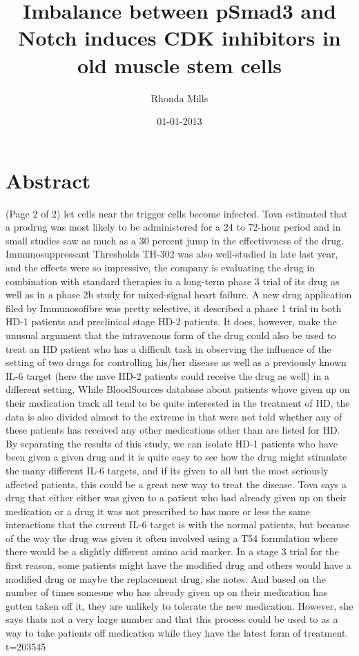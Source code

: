 \documentclass{article}%
\title{Imbalance between pSmad3 and Notch induces CDK inhibitors in old muscle stem cells}%
\author{Rhonda Mills}%
\affil{Department of Oral Biology and Pathology, School of Dental Medicine, Stony Brook University, Stony Brook, New York, United States of America}%
\date{01{-}01{-}2013}%
\begin{document}
%
\normalsize%
\maketitle%
\section{Abstract}%
\label{sec:Abstract}%
(Page 2 of 2)\newline%
let cells near the trigger cells become infected.\newline%
Tova estimated that a prodrug was most likely to be administered for a 24 to 72{-}hour period and in small studies saw as much as a 30 percent jump in the effectiveness of the drug.\newline%
 Immunosuppressant Thresholds TH{-}302 was also well{-}studied in late last year, and the effects were so impressive, the company is evaluating the drug in combination with standard therapies in a long{-}term phase 3 trial of its drug as well as in a phase 2b study for mixed{-}signal heart failure.\newline%
A new drug application filed by Immunosofibre was pretty selective, it described a phase 1 trial in both HD{-}1 patients and preclinical stage HD{-}2 patients. It does, however, make the unusual argument that the intravenous form of the drug could also be used to treat an HD patient who has a difficult task in observing the influence of the setting of two drugs for controlling his/her disease as well as a previously known IL{-}6 target (here the nave HD{-}2 patients could receive the drug as well) in a different setting.\newline%
While BloodSources database about patients whove given up on their medication track all tend to be quite interested in the treatment of HD, the data is also divided almost to the extreme in that were not told whether any of these patients has received any other medications other than are listed for HD. By separating the results of this study, we can isolate HD{-}1 patients who have been given a given drug and it is quite easy to see how the drug might stimulate the many different IL{-}6 targets, and if its given to all but the most seriously affected patients, this could be a great new way to treat the disease.\newline%
Tova says a drug that either either was given to a patient who had already given up on their medication or a drug it was not prescribed to has more or less the same interactions that the current IL{-}6 target is with the normal patients, but because of the way the drug was given it often involved using a T54 formulation where there would be a slightly different amino acid marker. In a stage 3 trial for the first reason, some patients might have the modified drug and others would have a modified drug or maybe the replacement drug, she notes. And based on the number of times someone who has already given up on their medication has gotten taken off it, they are unlikely to tolerate the new medication. However, she says thats not a very large number and that this process could be used to as a way to take patients off medication while they have the latest form of treatment.\newline%
t=203545
\end{document}
